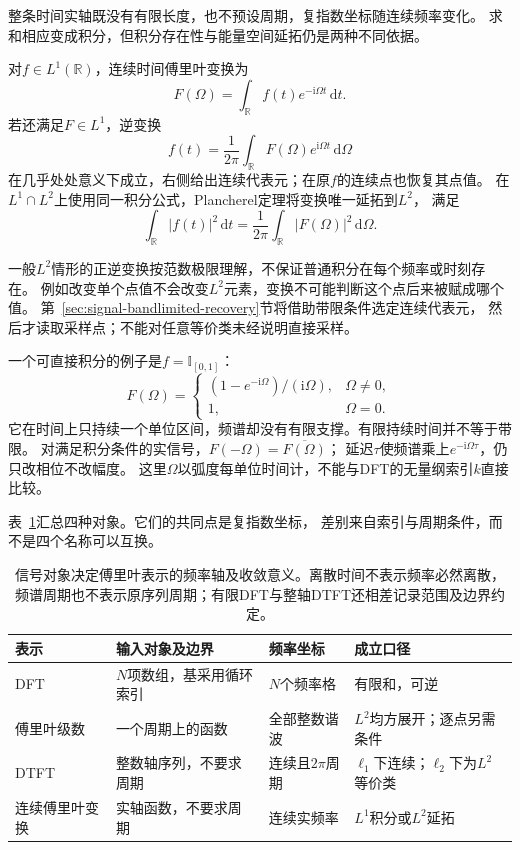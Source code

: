 整条时间实轴既没有有限长度，也不预设周期，复指数坐标随连续频率变化。
求和相应变成积分，但积分存在性与能量空间延拓仍是两种不同依据。
\begin{definition}[连续时间傅里叶变换]
  \label{def:signal-analysis-continuous-fourier-transform}
  对$f\in L^1(\mathbb R)$，连续时间傅里叶变换为
  \[
    F(\Omega)=\int_{\mathbb R}f(t)e^{-\mathrm i\Omega t}\,\mathrm dt.
  \]
  若还满足$F\in L^1$，逆变换
  \[
    f(t)=\frac1{2\pi}\int_{\mathbb R}F(\Omega)e^{\mathrm i\Omega t}\,\mathrm d\Omega
  \]
  在几乎处处意义下成立，右侧给出连续代表元；在原$f$的连续点也恢复其点值。
  在$L^1\cap L^2$上使用同一积分公式，Plancherel定理将变换唯一延拓到$L^2$，
  满足
  \[
    \int_{\mathbb R}|f(t)|^2\,\mathrm dt
    =\frac1{2\pi}\int_{\mathbb R}|F(\Omega)|^2\,\mathrm d\Omega.
  \]
\end{definition}
一般$L^2$情形的正逆变换按范数极限理解，不保证普通积分在每个频率或时刻存在。
例如改变单个点值不会改变$L^2$元素，变换不可能判断这个点后来被赋成哪个值。
第~\ref{sec:signal-bandlimited-recovery}节将借助带限条件选定连续代表元，
然后才读取采样点；不能对任意等价类未经说明直接采样。

一个可直接积分的例子是$f=\mathbb I_{[0,1]}$：
\[
  F(\Omega)=
  \begin{cases}
    (1-e^{-\mathrm i\Omega})/(\mathrm i\Omega),&\Omega\neq0,\\
    1,&\Omega=0.
  \end{cases}
\]
它在时间上只持续一个单位区间，频谱却没有有限支撑。有限持续时间并不等于带限。
对满足积分条件的实信号，$F(-\Omega)=\overline{F(\Omega)}$；
延迟$\tau$使频谱乘上$e^{-\mathrm i\Omega\tau}$，仍只改相位不改幅度。
这里$\Omega$以弧度每单位时间计，不能与DFT的无量纲索引$k$直接比较。

表~\ref{tab:reader-fourier-objects}汇总四种对象。它们的共同点是复指数坐标，
差别来自索引与周期条件，而不是四个名称可以互换。
\begin{table}[htbp]
  \centering
  \begin{tabularx}{\linewidth}{lXXX}
    \toprule
    表示 & 输入对象及边界 & 频率坐标 & 成立口径\\
    \midrule
    DFT & $N$项数组，基采用循环索引 & $N$个频率格 & 有限和，可逆\\
    傅里叶级数 & 一个周期上的函数 & 全部整数谐波 & $L^2$均方展开；逐点另需条件\\
    DTFT & 整数轴序列，不要求周期 & 连续且$2\pi$周期 & $\ell_1$下连续；$\ell_2$下为$L^2$等价类\\
    连续傅里叶变换 & 实轴函数，不要求周期 & 连续实频率 & $L^1$积分或$L^2$延拓\\
    \bottomrule
  \end{tabularx}
  \caption{信号对象决定傅里叶表示的频率轴及收敛意义。离散时间不表示频率必然离散，
  频谱周期也不表示原序列周期；有限DFT与整轴DTFT还相差记录范围及边界约定。}
  \label{tab:reader-fourier-objects}
\end{table}

